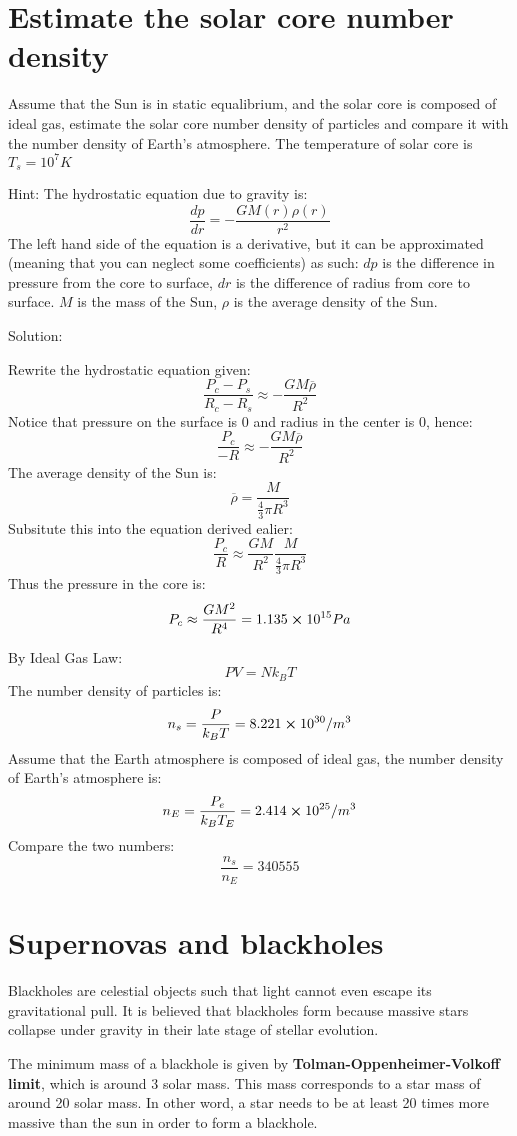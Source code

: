 \documentclass{article}
\numberwithin{equation}{section}
\begin{document}
\section{Estimate the solar core number density}
Assume that the Sun is in static equalibrium, and the solar core is composed of ideal gas, 
estimate the solar core number density of particles and compare it with the number density of Earth's atmosphere.
The temperature of solar core is $T_s = 10^7K$

Hint: The hydrostatic equation due to gravity is:
\[
\frac{dp}{dr}=-\frac{GM(r)\rho(r)}{r^2}
\]
The left hand side of the equation is a derivative, but it can be approximated (meaning that you can neglect some coefficients) as such:
$dp$ is the  difference in pressure from the core to surface, 
$dr$ is the difference of radius from core to surface. $M$ is the mass of the Sun, 
$\rho$ is the average density of the Sun.

\newpage
Solution:

Rewrite the hydrostatic equation given:
\[
\frac{P_c - P_s}{R_c - R_s} \approx -\frac{GM\overline{\rho}}{R^2}
\]
Notice that pressure on the surface is 0 and radius in the center is 0, hence:
\[
\frac{P_c}{-R} \approx -\frac{GM\overline{\rho}}{R^2}
\]
The average density of the Sun is:
\[
\overline{\rho} = \frac{M}{\frac{4}{3}\pi R^3}
\]
Subsitute this into the equation derived ealier:
\[
\frac{P_c}{R} \approx \frac{GM}{R^2}\frac{M}{\frac{4}{3}\pi R^3}
\]
Thus the pressure in the core is:
\[
P_c \approx \frac{GM^2}{R^4} = 1.135\cross10^{15}Pa
\]

By Ideal Gas Law:
\[
PV = Nk_BT
\]
The number density of particles is:
\[
n_s = \frac{P}{k_BT} = 8.221\cross10^{30}/m^3
\]
Assume that the Earth atmosphere is composed of ideal gas, the number density of Earth's atmosphere is:
\[
n_E = \frac{P_e}{k_BT_E} = 2.414 \cross 10^{25}/m^3
\]
Compare the two numbers:
\[
\frac{n_s}{n_E} = 340555
\]

\newpage
\section{Supernovas and blackholes}
Blackholes are celestial objects such that light cannot even escape its gravitational pull. 
It is believed that blackholes form because massive stars collapse under gravity in their late stage of stellar evolution.

The minimum mass of a blackhole is given by \textbf{Tolman-Oppenheimer-Volkoff limit}, which is around 3 solar mass. 
This mass corresponds to a star mass of around 20 solar mass. In other word, a star needs to be at least 20 times more massive than the sun in order to form a blackhole.
\end{document}
